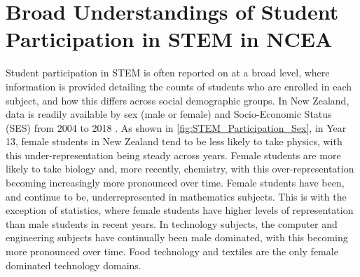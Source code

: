 \section*{Broad Understandings of Student Participation in STEM in NCEA}
Student participation in STEM is often reported on at a broad level, where information is provided detailing the counts of students who are enrolled in each subject, and how this differs across social demographic groups. In New Zealand, data is readily available by sex (male or female) and Socio-Economic Status (SES) from 2004 to 2018 \cite{EducationCounts_2018}. As shown in \ref{fig:STEM_Participation_Sex}, in Year 13, female students in New Zealand tend to be less likely to take physics, with this under-representation being steady across years. Female students are more likely to take biology and, more recently, chemistry, with this over-representation becoming increasingly more pronounced over time. Female students have been, and continue to be, underrepresented in mathematics subjects. This is with the exception of statistics, where female students have higher levels of representation than male students in recent years. In technology subjects, the computer and engineering subjects have continually been male dominated, with this becoming more pronounced over time. Food technology and textiles are the only female dominated technology domains. 
